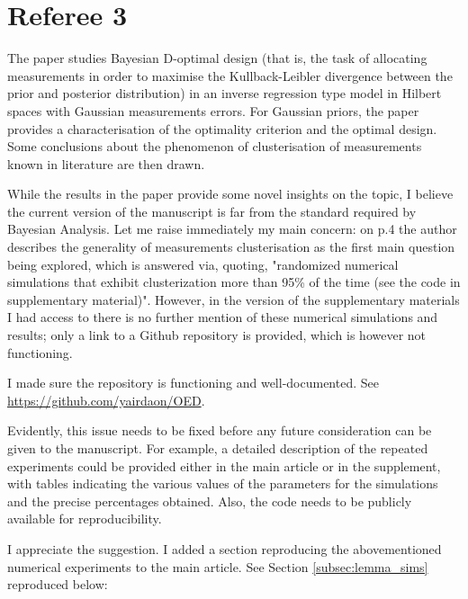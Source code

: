 \section{Referee 3}\label{ref3}
\RC The paper studies Bayesian D-optimal design (that is, the task of
allocating measurements in order to maximise the Kullback-Leibler
divergence between the prior and posterior distribution) in an inverse
regression type model in Hilbert spaces with Gaussian measurements
errors. For Gaussian priors, the paper provides a characterisation of
the optimality criterion and the optimal design. Some conclusions
about the phenomenon of clusterisation of measurements known in
literature are then drawn.


\RC While the results in the paper provide some novel insights on the
topic, I believe the current version of the manuscript is far from the
standard required by Bayesian Analysis. Let me raise immediately my
main concern: on p.4 the author describes the generality of
measurements clusterisation as the first main question being explored,
which is answered via, quoting, "randomized numerical simulations that
exhibit clusterization more than 95\% of the time (see the code in
supplementary material)". However, in the version of the supplementary
materials I had access to there is no further mention of these
numerical simulations and results; only a link to a Github repository
is provided, which is however not functioning.

\AR I made sure the repository is functioning and well-documented. See
\url{https://github.com/yairdaon/OED}.


\RC Evidently, this issue needs to be fixed before any future
consideration can be given to the manuscript. For example, a detailed
description of the repeated experiments could be provided either in
the main article or in the supplement, with tables indicating the
various values of the parameters for the simulations and the precise
percentages obtained. Also, the code needs to be publicly available
for reproducibility.

\AR I appreciate the suggestion. I added a section reproducing the
abovementioned numerical experiments to the main article. See Section
\ref{subsec:lemma_sims} reproduced below:



